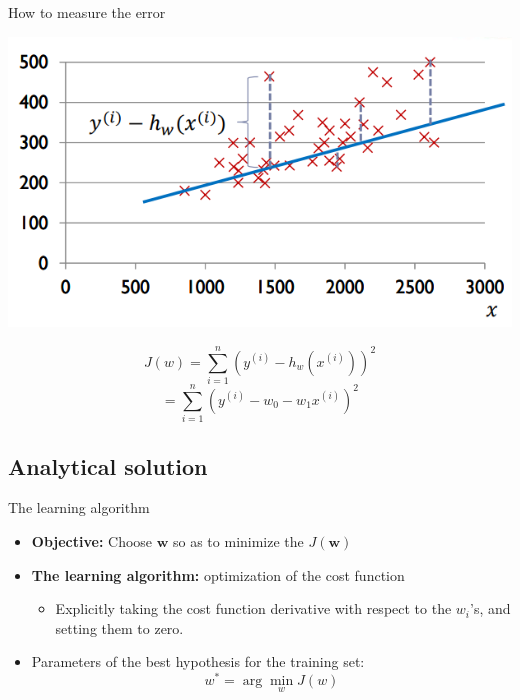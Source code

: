 \documentclass[serif, aspectratio=169]{beamer}
\begin{document}
\begin{frame}{How to measure the error}

    \begin{minipage}{0.5\textwidth}
        \centering
        \includegraphics[width=\textwidth]{pic/6.png}
    \end{minipage}%
    \begin{minipage}{0.5\textwidth}
    
        \[
        J(w) = \sum_{i=1}^{n} \left( y^{(i)} - h_w(x^{(i)}) \right)^2
        \]
        \[
        = \sum_{i=1}^{n} \left( y^{(i)} - w_0 - w_1 x^{(i)} \right)^2
        \]
    \end{minipage}
    \vfill
\end{frame}

\subsection{Analytical solution}
\begin{frame}{The learning algorithm}

    \begin{itemize}
        \item \textbf{Objective:} Choose \( \mathbf{w} \) so as to minimize the \( J(\mathbf{w}) \)
    
        \item \textbf{The learning algorithm:} optimization of the cost function
        \begin{itemize}
            \item Explicitly taking the cost function derivative with respect to the \( w_i \)'s, and setting them to zero.
        \end{itemize}
        
        \item Parameters of the best hypothesis for the training set:
        \[
        w^* = \arg \min_{w} J(w)
        \]
    \end{itemize}
\end{frame}
\end{document}
